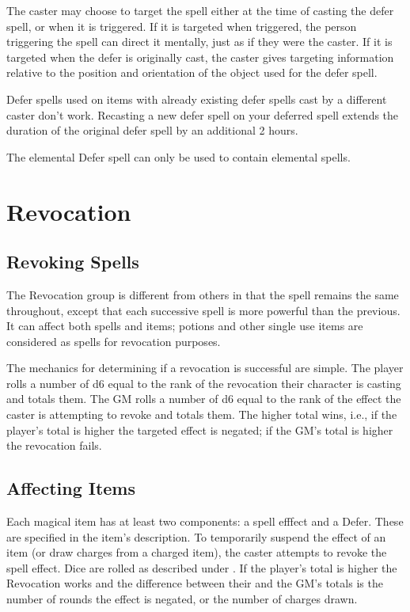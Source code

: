The caster may choose to target the spell either at the time of casting the defer spell, or when it is triggered. If it is targeted when triggered, the person triggering the spell can direct it mentally, just as if they were the caster. If it is targeted when the defer is originally cast, the caster gives targeting information relative to the position and orientation of the object used for the defer spell.

Defer spells used on items with already existing defer spells cast by a different caster don’t work. Recasting a new defer spell on your deferred spell extends the duration of the original defer spell by an additional 2 hours.

The elemental Defer spell can only be used to contain elemental spells.
\pagebreak
\section{Revocation}


\subsection{Revoking Spells}
\label{magic-elemental-core-revoking-spells}

The Revocation group is different from others in that the spell remains the same throughout, except that each successive spell is more powerful than the previous. It can affect both spells and items; potions and other single use items are considered as spells for revocation purposes.

The mechanics for determining if a revocation is successful are simple. The player rolls a number of d6 equal to the rank of the revocation their character is casting and totals them. The GM rolls a number of d6 equal to the rank of the effect the caster is attempting to revoke and totals them. The higher total wins, i.e., if the player's total is higher the targeted effect is negated; if the GM's total is higher the revocation fails.

\subsection{Affecting Items}

Each magical item has at least two components: a spell efffect and a Defer. These are specified in the item's description. To temporarily suspend the effect of an item (or draw charges from a charged item), the caster attempts to revoke the spell effect. Dice are rolled as described under . If the player’s total is higher the Revocation works and the difference between their and the GM's totals is the number of rounds the effect is negated, or the number of charges drawn.

